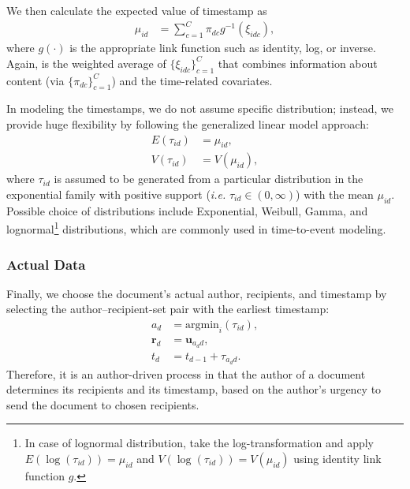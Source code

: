 \documentclass[twoside]{article}
\begin{document}
We then calculate the expected value of timestamp as
\begin{align*}\mu_{id} &= \sum_{c=1}^C \pi_{dc} g^{-1}(\xi_{idc}),
\end{align*}
where $g(\cdot)$ is the appropriate link function such as identity, log, or inverse. Again, is the weighted average of $\{\xi_{idc}\}_{c=1}^C$ that combines information about content (via $\{\pi_{dc}\}_{c=1}^C$) and the time-related covariates.

In modeling the timestamps, we do not assume specific distribution; instead, we provide huge flexibility by following the generalized linear model approach:
\begin{align*}
E(\tau_{id}) &= \mu_{id},\\
V(\tau_{id}) &= V(\mu_{id}),
\end{align*}
where $\tau_{id}$ is assumed to be generated from a particular distribution in the exponential family with positive support (\textit{i.e.} $\tau_{id} \in (0, \infty)$) with the mean $\mu_{id}$. Possible choice of distributions include Exponential, Weibull, Gamma, and lognormal\footnote{In case of lognormal distribution, take the log-transformation and apply $E(\log(\tau_{id})) = \mu_{id}$ and $ V(\log(\tau_{id})) = V(\mu_{id})$ using identity link function $g$.} distributions, which are commonly used in time-to-event modeling.

\subsubsection{Actual Data}\label{subsubsec:Actual Data}
Finally, we choose the document's actual author, recipients, and timestamp by selecting the author--recipient-set pair with the earliest timestamp:
\begin{align*}
a_d &= \mbox{argmin}_{i}(\tau_{id}),\\
\boldsymbol{r}_d &= \boldsymbol{u}_{a_d d},\\
t_d &=t_{d-1} + \tau_{a_d d}.
\end{align*}
Therefore, it is an author-driven process in that the author of a document determines its recipients and its timestamp, based on the author's urgency to send the document to chosen recipients. 
\end{document}
